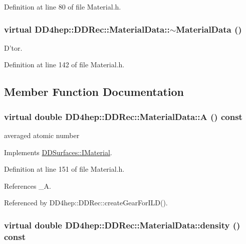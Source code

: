 Definition at line 80 of file Material.h.\hypertarget{class_d_d4hep_1_1_d_d_rec_1_1_material_data_af8e5c9f475adfaef01379519c9e92929}{
\subsubsection[{$\sim$MaterialData}]{\setlength{\rightskip}{0pt plus 5cm}virtual DD4hep::DDRec::MaterialData::$\sim$MaterialData ()}}
\label{class_d_d4hep_1_1_d_d_rec_1_1_material_data_af8e5c9f475adfaef01379519c9e92929}
D'tor. 

Definition at line 142 of file Material.h.

\subsection{Member Function Documentation}
\hypertarget{class_d_d4hep_1_1_d_d_rec_1_1_material_data_a742efa66c52faa0f1c1f578ccef2aa61}{
\subsubsection[{A}]{\setlength{\rightskip}{0pt plus 5cm}virtual double DD4hep::DDRec::MaterialData::A () const}}
\label{class_d_d4hep_1_1_d_d_rec_1_1_material_data_a742efa66c52faa0f1c1f578ccef2aa61}


averaged atomic number 

Implements \hyperlink{class_d_d_surfaces_1_1_i_material_a02f156030abe09aa3ebe9a4c99b059b2}{DDSurfaces::IMaterial}.

Definition at line 151 of file Material.h.

References \_\-A.

Referenced by DD4hep::DDRec::createGearForILD().\hypertarget{class_d_d4hep_1_1_d_d_rec_1_1_material_data_a19e29eb0fbddd4c152c3ebfe5843fddb}{
\subsubsection[{density}]{\setlength{\rightskip}{0pt plus 5cm}virtual double DD4hep::DDRec::MaterialData::density () const}}
\label{class_d_d4hep_1_1_d_d_rec_1_1_material_data_a19e29eb0fbddd4c152c3ebfe5843fddb}


